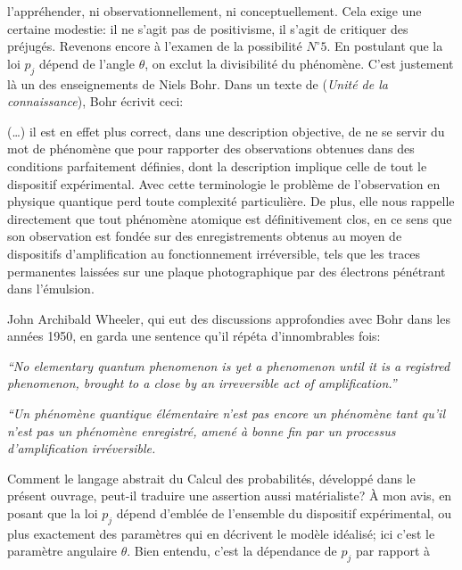 l'appr\'ehender,  ni observationnellement,  ni conceptuellement. 
Cela exige une certaine modestie:  il ne s'agit pas de
{\og positivisme\fg},  il s'agit de critiquer des pr\'ejug\'es.
\medskip
Revenons encore \`a l'examen de la possibilit\'e $N^\circ 5$. 
En postulant que la loi $p_j$ d\'epend de l'angle $\theta$, 
on exclut la divisibilit\'e du ph\'enom\`ene.  C'est justement l\`a
un des enseignements de Niels Bohr.  Dans un texte de {} ({\it Unit\'e de la connaissance}),  Bohr \'ecrivit ceci: 
\smallskip
{\cit (\dots) il est en effet plus correct,  dans une description
objective,  de ne se servir du mot de ph\'enom\`ene que pour
rapporter des observations obtenues dans des conditions
parfaitement d\'efinies,  dont la description implique celle de
tout le dispositif exp\'erimental.  Avec cette terminologie le
probl\`eme de l'observation en physique quantique perd toute
complexit\'e particuli\`ere.  De plus,  elle nous rappelle
directement que tout ph\'enom\`ene atomique est {\og
d\'efinitivement clos\fg},  en ce sens que son observation est
fond\'ee sur des enregistrements obtenus au moyen de dispositifs
d'amplification au fonctionnement irr\'eversible,  tels que
les traces permanentes laiss\'ees sur une plaque photographique
par des \'electrons p\'en\'etrant dans l'\'emulsion. \par}
\medskip
John Archibald Wheeler,  qui eut des discussions approfondies
avec Bohr dans les ann\'ees 1950,  en garda une sentence qu'il
r\'ep\'eta d'innombrables fois:
\medskip
{\narrower \sl ``No elementary quantum phenomenon is yet a
phenomenon until it is a registred phenomenon,  brought to a
close by an irreversible act of amplification.'' \par}
\medskip
{\narrower \sl ``Un ph\'enom\`ene quantique \'el\'ementaire n'est
pas encore un ph\'e\-no\-m\`ene tant qu'il n'est pas un ph\'enom\`ene
enregistr\'e,  amen\'e \`a bonne fin par un processus
d'amplification irr\'eversible.\par}
\medskip
Comment le langage abstrait du Calcul des probabilit\'es, 
d\'evelopp\'e dans le pr\'esent ouvrage,  peut-il traduire une
assertion aussi mat\'erialiste?  \`A mon avis,  en posant que
la loi $p_j$ d\'epend d'embl\'ee de l'ensemble du dispositif
exp\'erimental,  ou plus exactement des param\`etres qui en
d\'ecrivent le mod\`ele id\'ealis\'e;  ici c'est le param\`etre
angulaire $\theta$. 
\medskip
Bien entendu,  c'est la d\'ependance de $p_j$ par rapport \`a
